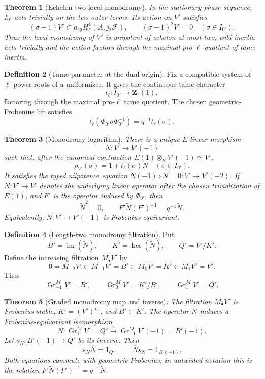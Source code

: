 \documentclass[10pt]{article}
\newtheorem{theorem}{Theorem}[section]
\theoremstyle{definition}
\newtheorem{definition}[theorem]{Definition}
\begin{document}
\begin{theorem}[Echelon-two local monodromy]
In the stationary-phase sequence, \(I_{0'}\) acts trivially on the two
outer terms.  Its action on \(V'\) satisfies
\[
 (\sigma-1)V'\subset a_{\mathrm{sp}}
 H_c^1(A,j_*\mathcal F),\qquad(\sigma-1)^2V'=0
 \quad(\sigma\in I_{0'}).
\]
Thus the local monodromy of \(V'\) is unipotent of echelon at most two; wild
inertia acts trivially and the action factors through the maximal pro-\(\ell\)
quotient of tame inertia.
\end{theorem}

\begin{definition}[Tame parameter at the dual origin]
Fix a compatible system of \(\ell\)-power roots of a uniformizer.  It gives
the continuous tame character
\[
 t_\ell:I_{0'}\longrightarrow\mathbf Z_\ell(1),
\]
factoring through the maximal pro-\(\ell\) tame quotient.  The chosen
geometric-Frobenius lift satisfies
\[
 t_\ell(\Phi_{0'}\sigma\Phi_{0'}^{-1})
       =q^{-1}t_\ell(\sigma).
\]
\end{definition}

\begin{theorem}[Monodromy logarithm]
There is a unique \(E\)-linear morphism
\[
 N:V'\longrightarrow V'(-1)
\]
such that, after the canonical contraction
\(E(1)\otimes_E V'(-1)\simeq V'\),
\[
 \rho_{V'}(\sigma)=1+t_\ell(\sigma)N
 \quad(\sigma\in I_{0'}).
\]
It satisfies the typed nilpotence equation
\(N(-1)\circ N=0:V'\to V'(-2)\).  If
\(\widetilde N:V'\to V'\) denotes the underlying linear operator after the
chosen trivialization of \(E(1)\), and \(F'\) is the operator induced by
\(\Phi_{0'}\), then
\[
 \widetilde N^2=0,\qquad
 F'\widetilde N(F')^{-1}=q^{-1}\widetilde N.
\]
Equivalently, \(N:V'\to V'(-1)\) is Frobenius-equivariant.
\end{theorem}

\begin{definition}[Length-two monodromy filtration]
Put
\[
 B'=\operatorname{im}(\widetilde N),\qquad
 K'=\ker(\widetilde N),\qquad Q'=V'/K'.
\]
Define the increasing filtration \(M_\bullet V'\) by
\[
 0=M_{-2}V'\subset M_{-1}V'=B'
 \subset M_0V'=K'\subset M_1V'=V'.
\]
Thus
\[
 \operatorname{Gr}_{-1}^M V'=B',\qquad
 \operatorname{Gr}_{0}^M V'=K'/B',\qquad
 \operatorname{Gr}_{1}^M V'=Q'.
\]
\end{definition}

\begin{theorem}[Graded monodromy map and inverse]
The filtration \(M_\bullet V'\) is Frobenius-stable,
\(K'=(V')^{I_{0'}}\), and \(B'\subset K'\).  The operator \(N\) induces
a Frobenius-equivariant isomorphism
\[
 \overline N:\operatorname{Gr}_{1}^M V'=Q'
       \xrightarrow{\sim}
       \operatorname{Gr}_{-1}^M V'(-1)=B'(-1).
\]
Let \(s_N:B'(-1)\to Q'\) be its inverse.  Then
\[
 s_N\overline N=1_{Q'},\qquad
 \overline N s_N=1_{B'(-1)}.
\]
Both equations commute with geometric Frobenius; in untwisted notation this
is the relation \(F'\widetilde N(F')^{-1}=q^{-1}\widetilde N\).
\end{theorem}
\end{document}
